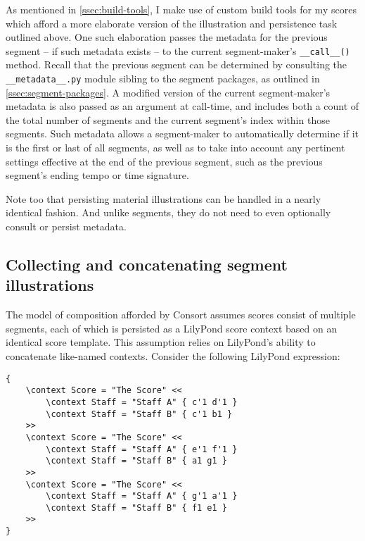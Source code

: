 As mentioned in \autoref{ssec:build-tools}, I make use of custom build tools
for my scores which afford a more elaborate version of the illustration and
persistence task outlined above. One such elaboration passes the metadata for
the previous segment -- if such metadata exists -- to the current
segment-maker's \texttt{\_\_call\_\_()} method. Recall that the previous
segment can be determined by consulting the \texttt{\_\_metadata\_\_.py} module
sibling to the segment packages, as outlined in
\autoref{ssec:segment-packages}. A modified version of the current
segment-maker's metadata is also passed as an argument at call-time, and
includes both a count of the total number of segments and the current segment's
index within those segments. Such metadata allows a segment-maker to
automatically determine if it is the first or last of all segments, as well as
to take into account any pertinent settings effective at the end of the
previous segment, such as the previous segment's ending tempo or time
signature.

Note too that persisting material illustrations can be handled in a nearly
identical fashion. And unlike segments, they do not need to even optionally
consult or persist metadata.

\subsection{Collecting and concatenating segment illustrations}
\label{ssec:collecting-and-concatenating-segment-illustrations}

The model of composition afforded by Consort assumes scores consist of multiple
segments, each of which is persisted as a LilyPond score context based on an
identical score template. This assumption relies on LilyPond's ability to
concatenate like-named contexts. Consider the following LilyPond expression:

\begin{singlespacing}
\vspace{-0.5\baselineskip}
\begin{verbatim}
{
    \context Score = "The Score" <<
        \context Staff = "Staff A" { c'1 d'1 }
        \context Staff = "Staff B" { c'1 b1 }
    >>
    \context Score = "The Score" <<
        \context Staff = "Staff A" { e'1 f'1 }
        \context Staff = "Staff B" { a1 g1 }
    >>
    \context Score = "The Score" <<
        \context Staff = "Staff A" { g'1 a'1 }
        \context Staff = "Staff B" { f1 e1 }
    >>
}
\end{verbatim}
\end{singlespacing}

